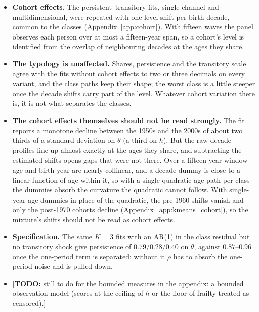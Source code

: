 \documentclass[11pt]{article}
\newcommand{\todo}[1]{\textcolor{red!75!black}{[\textbf{TODO:} #1]}}
\begin{document}
\begin{itemize}
		\item \textbf{Cohort effects.} The persistent--transitory fits, single-channel and multidimensional, were repeated with one level shift per birth decade, common to the classes (Appendix~\ref{app:cohort}). With fifteen waves the panel observes each person over at most a fifteen-year span, so a cohort's level is identified from the overlap of neighbouring decades at the ages they share.
		\item \textbf{The typology is unaffected.} Shares, persistence and the transitory scale agree with the fits without cohort effects to two or three decimals on every variant, and the class paths keep their shape; the worst class is a little steeper once the decade shifts carry part of the level. Whatever cohort variation there is, it is not what separates the classes.
		\item \textbf{The cohort effects themselves should not be read strongly.} The fit reports a monotone decline between the 1950s and the 2000s of about two thirds of a standard deviation on $\theta$ (a third on $h$). But the raw decade profiles line up almost exactly at the ages they share, and subtracting the estimated shifts opens gaps that were not there. Over a fifteen-year window age and birth year are nearly collinear, and a decade dummy is close to a linear function of age within it, so with a single quadratic age path per class the dummies absorb the curvature the quadratic cannot follow. With single-year age dummies in place of the quadratic, the pre-1960 shifts vanish and only the post-1970 cohorts decline (Appendix~\ref{app:kmeans_cohort}), so the mixture's shifts should not be read as cohort effects.
		\item \textbf{Specification.} The same $K=3$ fits with an AR(1) in the class residual but no transitory shock give persistence of $0.79/0.28/0.40$ on $\theta$, against $0.87$--$0.96$ once the one-period term is separated: without it $\rho$ has to absorb the one-period noise and is pulled down.
		\item \todo{still to do for the bounded measures in the appendix: a bounded observation model (scores at the ceiling of $h$ or the floor of frailty treated as censored).}
	\end{itemize}
	
\end{document}
